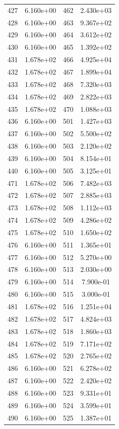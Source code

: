\documentclass[12pt]{article}
\begin{document}
\begin{longtable}{@{}cccc@{}}
427 & 6.160e+00 & 462 & 2.430e+03 \\
428 & 6.160e+00 & 463 & 9.367e+02 \\
429 & 6.160e+00 & 464 & 3.612e+02 \\
430 & 6.160e+00 & 465 & 1.392e+02 \\
431 & 1.678e+02 & 466 & 4.925e+04 \\
432 & 1.678e+02 & 467 & 1.899e+04 \\
433 & 1.678e+02 & 468 & 7.320e+03 \\
434 & 1.678e+02 & 469 & 2.822e+03 \\
435 & 1.678e+02 & 470 & 1.088e+03 \\
436 & 6.160e+00 & 501 & 1.427e+03 \\
437 & 6.160e+00 & 502 & 5.500e+02 \\
438 & 6.160e+00 & 503 & 2.120e+02 \\
439 & 6.160e+00 & 504 & 8.154e+01 \\
440 & 6.160e+00 & 505 & 3.125e+01 \\
471 & 1.678e+02 & 506 & 7.482e+03 \\
472 & 1.678e+02 & 507 & 2.885e+03 \\
473 & 1.678e+02 & 508 & 1.112e+03 \\
474 & 1.678e+02 & 509 & 4.286e+02 \\
475 & 1.678e+02 & 510 & 1.650e+02 \\
476 & 6.160e+00 & 511 & 1.365e+01 \\
477 & 6.160e+00 & 512 & 5.270e+00 \\
478 & 6.160e+00 & 513 & 2.030e+00 \\
479 & 6.160e+00 & 514 & 7.900e-01 \\
480 & 6.160e+00 & 515 & 3.000e-01 \\
481 & 1.678e+02 & 516 & 1.251e+04 \\
482 & 1.678e+02 & 517 & 4.824e+03 \\
483 & 1.678e+02 & 518 & 1.860e+03 \\
484 & 1.678e+02 & 519 & 7.171e+02 \\
485 & 1.678e+02 & 520 & 2.765e+02 \\
486 & 6.160e+00 & 521 & 6.278e+02 \\
487 & 6.160e+00 & 522 & 2.420e+02 \\
488 & 6.160e+00 & 523 & 9.331e+01 \\
489 & 6.160e+00 & 524 & 3.599e+01 \\
490 & 6.160e+00 & 525 & 1.387e+01 \\

\end{longtable}
\end{document}
